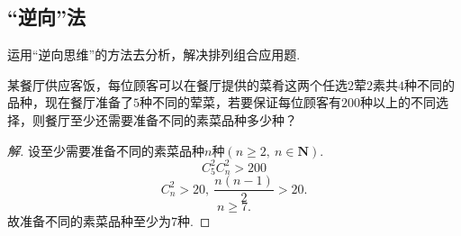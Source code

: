 \documentclass{BHCexam}
\begin{document}
\subsection{“逆向”法   }
 运用“逆向思维”的方法去分析，解决排列组合应用题.\par
\begin{example}
某餐厅供应客饭，每位顾客可以在餐厅提供的菜肴这两个任选$ 2 $荤$ 2 $素共$ 4 $种不同的品种，现在餐厅准备了$ 5 $种不同的荤菜，若要保证每位顾客有$ 200 $种以上的不同选择，则餐厅至少还需要准备不同的素菜品种多少种？
\end{example}
\begin{proof}[解]
设至少需要准备不同的素菜品种$ n $种$(n\ge 2,~n\in \mathbf{N})$.
\[C_5^2C_n^2>200\]
\[C_n^2>20,~\dfrac{n(n-1)}{2}>20.\]
\[n\ge 7.\]
故准备不同的素菜品种至少为$ 7 $种.
\end{proof}
\end{document}
